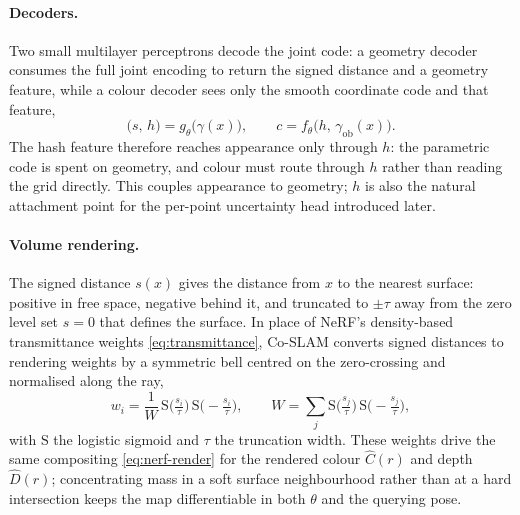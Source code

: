 \documentclass{article}
\begin{document}
\paragraph{Decoders.} Two small multilayer perceptrons decode the joint code: a geometry decoder consumes the full joint encoding to return the signed distance and a geometry feature, while a colour decoder sees only the smooth coordinate code and that feature,
\begin{equation}
    \big(s,\, h\big) = g_\theta\big(\gamma(x)\big), \qquad
    c = f_\theta\big(h,\, \gamma_{\text{ob}}(x)\big).
    \label{eq:decoders}
\end{equation}
The hash feature therefore reaches appearance only through $h$: the parametric code is spent on geometry, and colour must route through $h$ rather than reading the grid directly. This couples appearance to geometry; $h$ is also the natural attachment point for the per-point uncertainty head introduced later.

\paragraph{Volume rendering.} The signed distance $s(x)$ gives the distance from $x$ to the nearest surface: positive in free space, negative behind it, and truncated to $\pm\tau$ away from the zero level set $s = 0$ that defines the surface. In place of NeRF's density-based transmittance weights \eqref{eq:transmittance}, Co-SLAM converts signed distances to rendering weights by a symmetric bell centred on the zero-crossing and normalised along the ray,
\begin{equation}
    w_i = \frac{1}{W}\,
    \mathrm{S}\!\Big(\tfrac{s_i}{\tau}\Big)\,
    \mathrm{S}\!\Big(-\tfrac{s_i}{\tau}\Big), \qquad
    W = \sum_{j} \mathrm{S}\!\Big(\tfrac{s_j}{\tau}\Big)\,\mathrm{S}\!\Big(-\tfrac{s_j}{\tau}\Big),
    \label{eq:sdf-weights}
\end{equation}
with $\mathrm{S}$ the logistic sigmoid and $\tau$ the truncation width. These weights drive the same compositing \eqref{eq:nerf-render} for the rendered colour $\hat{C}(r)$ and depth $\hat{D}(r)$; concentrating mass in a soft surface neighbourhood rather than at a hard intersection keeps the map differentiable in both $\theta$ and the querying pose.
\end{document}
